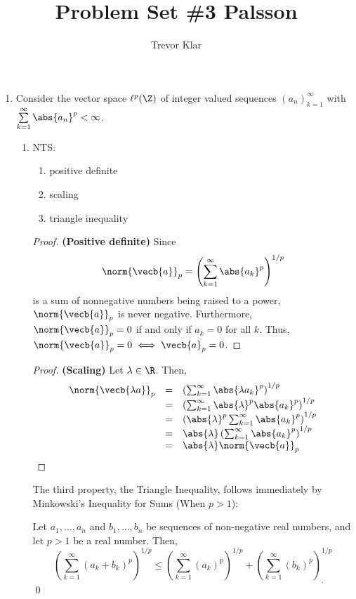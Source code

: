 \documentclass[letterpaper]{article}
\title{Problem Set \#3 \linebreak
Palsson}
\author{Trevor Klar}
\begin{document}
\maketitle

\begin{enumerate}[label=P\arabic*)]
\item Consider the vector space $\ell^p(\Z)$ of integer valued sequences $(a_n)_{k=1}^\infty$ with $\sum\limits_{k=1}^\infty \abs{a_n}^p<\infty$. 
\begin{enumerate}
\item
NTS: 
	\begin{enumerate}
	\item positive definite
	\item scaling
	\item triangle inequality
	\end{enumerate}
\begin{proof}\textbf{(Positive definite)}
Since 
$$\norm{\vecb{a}}_p=\left(\sum_{k=1}^\infty \abs{a_k}^p\right)^{1/p}$$
is a sum of nonnegative numbers being raised to a power, $\norm{\vecb{a}}_p$ is never negative. Furthermore, $\norm{\vecb{a}}_p=0$ if and only if $a_k=0$ for all $k$. Thus, $\norm{\vecb{a}}_p=0\iff{\vecb{a}}_p=0$.
\end{proof}
\begin{proof}\textbf{(Scaling)}
Let $\lambda\in\R$. Then, 
\[\begin{array}{rcl}
\norm{\vecb{\lambda a}}_p&=&\left(\sum_{k=1}^\infty \abs{\lambda a_k}^p\right)^{1/p}\\
&=&\left(\sum_{k=1}^\infty \abs{\lambda}^p \abs{a_k}^p\right)^{1/p}\\
&=&\left(\abs{\lambda}^p \sum_{k=1}^\infty \abs{a_k}^p\right)^{1/p}\\
&=&\abs{\lambda} \left(\sum_{k=1}^\infty \abs{a_k}^p\right)^{1/p}\\
&=&\abs{\lambda}\norm{\vecb{ a}}_p
\end{array} \]
\end{proof}
The third property, the Triangle Inequality, follows immediately by Minkowski's Inequality for Sums (When $p>1$):
\begin{theorem*}
Let $a_1, \dots, a_n$ and $b_1, \dots, b_n$ be sequences of non-negative real numbers, and let $p>1$ be a real number. Then, 
$$\left(\sum_{k=1}^\infty (a_k+b_k)^p\right)^{1/p}\leq \left(\sum_{k=1}^\infty (a_k)^p\right)^{1/p}+\left(\sum_{k=1}^\infty (b_k)^p\right)^{1/p}_.$$\qed
\end{theorem*}


\end{enumerate}
\end{enumerate}
\end{document}
